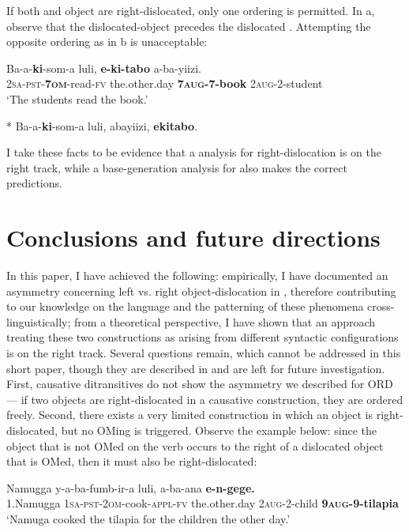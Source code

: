 \documentclass[output=paper
,newtxmath
,modfonts
,nonflat]{langsci/langscibook}
\begin{document}
If both  and object are right-dislocated, only one ordering is permitted. In a, observe that the dislocated-object precedes the dislocated . Attempting the opposite ordering as in b is unacceptable:

\ea\label{ex:ranero:41}
\ea\label{ex:ranero:41a}
\gll Ba-a-\textbf{ki}{}-som-a      luli,        \textbf{e-ki-tabo} a-ba-yiizi.\\
\textsc{2sa-pst-}\textbf{\textsc{7om}}{}-read-\textsc{fv} the.other.day \textbf{\textsc{7aug-7}}\textbf{{}-book} \textsc{2aug}{}-2-student\\
\glt ‘The students read the book.’

\ex\label{ex:ranero:41b}
* Ba-a-\textbf{ki}{}-som-a  luli,   abayiizi,   \textbf{ekitabo}.
\z
\z

\textup{I take these facts to be evidence that a  analysis for right-dislocation is on the right track, while a base-generation analysis for  also makes the correct predictions.}


\section{Conclusions and future directions}\label{sec:ranero:6}

\textup{In this paper, I have achieved the following: empirically, I have documented an asymmetry concerning left vs. right object-dislocation in , therefore contributing to our knowledge on the language and the patterning of these phenomena cross-linguistically; from a theoretical perspective, I have shown that an approach treating these two constructions as arising from different syntactic configurations is on the right track. Several questions remain, which cannot be addressed in this short paper, though they are described in \citet{ranero2015} and are left for future investigation. First, causative ditransitives do not show the asymmetry we described for ORD — if two objects are right-dislocated in a causative construction, they are ordered freely. Second, there exists a very limited construction in which an object is right-dislocated, but no OMing is triggered. Observe the example below: since the object that is not OMed on the verb occurs to the right of a dislocated object that is OMed, then it must also be right-dislocated:}


\ea\label{ex:ranero:42}
\gll Namugga    y-a-ba{}-fumb-ir-a           luli,             a-ba-ana         \textbf{e-n-gege.}\\
1.Namugga \textsc{1sa-pst-2om}{}-cook-\textsc{appl-fv} the.other.day \textsc{2aug-}2-child \textbf{\textsc{9aug-}}\textbf{9-tilapia}\\
\glt ‘Namuga cooked the tilapia for the children the other day.’
\z
\end{document}
